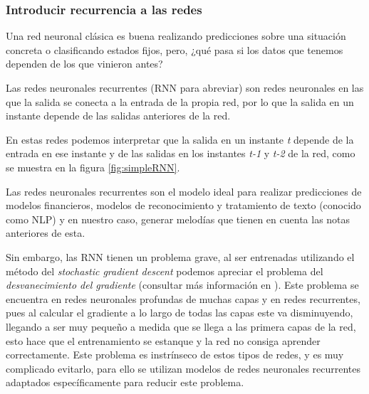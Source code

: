     \subsubsection{Introducir recurrencia a las redes}
    \label{subsub:introRedesNeuronalesRecurrentes}
    Una red neuronal clásica es buena realizando predicciones sobre una situación concreta o clasificando estados fijos, pero, ¿qué pasa si los datos que tenemos dependen de los que vinieron antes?

    Las redes neuronales recurrentes (RNN para abreviar) son redes neuronales en las que la salida se conecta a la entrada de la propia red, por lo que la salida en un instante depende de las salidas anteriores de la red.

    En estas redes podemos interpretar que la salida en un instante \textit{t} depende de la entrada en ese instante y de las salidas en los instantes \textit{t-1} y \textit{t-2} de la red, como se muestra en la figura \ref{fig:simpleRNN}.

    Las redes neuronales recurrentes son el modelo ideal para realizar predicciones de modelos financieros, modelos de reconocimiento y tratamiento de texto (conocido como NLP) y en nuestro caso, generar melodías que tienen en cuenta las notas anteriores de esta.

    Sin embargo, las RNN tienen un problema grave, al ser entrenadas utilizando el método del \textit{stochastic gradient descent} podemos apreciar el problema del \textit{desvanecimiento del gradiente} (consultar más información en \cite{M.A.Nielsen_Chapter5}). Este problema se encuentra en redes neuronales profundas de muchas capas y en redes recurrentes, pues al calcular el gradiente a lo largo de todas las capas este va disminuyendo, llegando a ser muy pequeño a medida que se llega a las primera capas de la red, esto hace que el entrenamiento se estanque y la red no consiga aprender correctamente. Este problema es instrínseco de estos tipos de redes, y es muy complicado evitarlo, para ello se utilizan modelos de redes neuronales recurrentes adaptados específicamente para reducir este problema.

